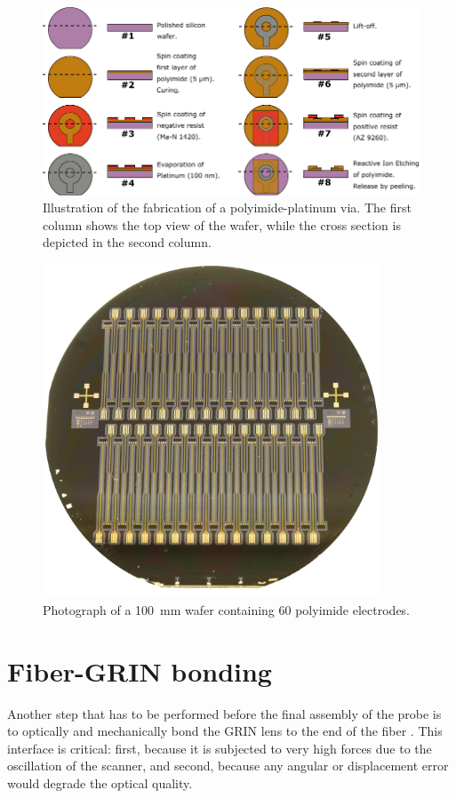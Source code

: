 \begin{figure}[h!]\centering \includegraphics[width=15cm]{figures/40_Fabrication/PI/processH.pdf}
      \caption{Illustration of the fabrication of a polyimide-platinum via. The first column shows the top view of the wafer, while the cross section is depicted in the second column.}
      \label{fig:piProcess}
\end{figure}

\begin{figure}[h!]\centering \includegraphics[width=10cm]{figures/40_Fabrication/PI/wafer.JPG}
      \caption{Photograph of a \SI{100}{\milli\meter} wafer containing 60 polyimide electrodes.}
      \label{fig:piwafer}
\end{figure}

\clearpage
\section{Fiber-GRIN bonding}
\label{sec:fiberGRIN}
Another step that has to be performed before the final assembly of the probe is to optically and mechanically bond the GRIN lens to the end of the fiber . This interface is critical: first, because it is subjected to very high forces due to the oscillation of the scanner, and second, because any angular or displacement error would degrade the optical quality.

